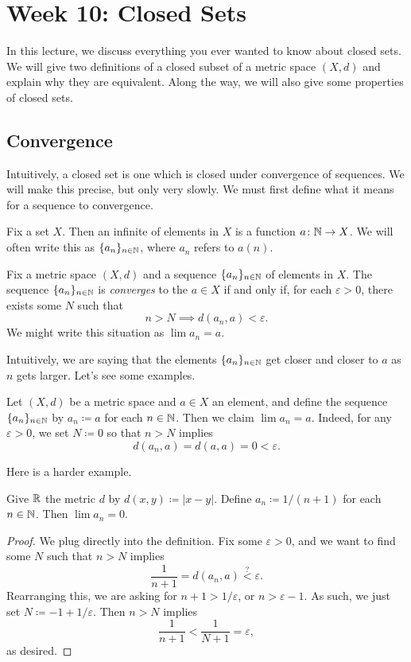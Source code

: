 \documentclass[../main.tex]{subfiles}
\begin{document}
\section{Week 10: Closed Sets}
In this lecture, we discuss everything you ever wanted to know about closed sets. We will give two definitions of a closed subset of a metric space $(X,d)$ and explain why they are equivalent. Along the way, we will also give some properties of closed sets.

\subsection{Convergence}
Intuitively, a closed set is one which is closed under convergence of sequences. We will make this precise, but only very slowly. We must first define what it means for a sequence to convergence.
\begin{definition}[sequence]
    Fix a set $X$. Then an infinite  of elements in $X$ is a function $a\colon\mathbb N\to X$. We will often write this as $\{a_n\}_{n\in\mathbb N}$, where $a_n$ refers to $a(n)$.
\end{definition}
\begin{definition}[limit]
    Fix a metric space $(X,d)$ and a sequence $\{a_n\}_{n\in\mathbb N}$ of elements in $X$. The sequence $\{a_n\}_{n\in\mathbb N}$ is \textit{converges} to the  $a\in X$ if and only if, for each $\varepsilon>0$, there exists some $N$ such that
    \[n>N\implies d(a_n,a)<\varepsilon.\]
    We might write this situation as $\lim a_n=a$.
\end{definition}
Intuitively, we are saying that the elements $\{a_n\}_{n\in\mathbb N}$ get closer and closer to $a$ as $n$ gets larger. Let's see some examples.
\begin{example}
    Let $(X,d)$ be a metric space and $a\in X$ an element, and define the sequence $\{a_n\}_{n\in\mathbb N}$ by $a_n\coloneqq a$ for each $n\in\mathbb N$. Then we claim $\lim a_n=a$. Indeed, for any $\varepsilon>0$, we set $N\coloneqq0$ so that $n>N$ implies
    \[d(a_n,a)=d(a,a)=0<\varepsilon.\]
\end{example}
Here is a harder example.
\begin{example} \label{exe:converge-to-zero}
    Give $\mathbb R$ the metric $d$ by $d(x,y)\coloneqq|x-y|$. Define $a_n\coloneqq1/(n+1)$ for each $n\in\mathbb N$. Then $\lim a_n=0$.
\end{example}
\begin{proof}
    We plug directly into the definition. Fix some $\varepsilon>0$, and we want to find some $N$ such that $n>N$ implies
    \[\frac1{n+1}=d(a_n,a)\stackrel?<\varepsilon.\]
    Rearranging this, we are asking for $n+1>1/\varepsilon$, or $n>\varepsilon-1$. As such, we just set $N\coloneqq-1+1/\varepsilon$. Then $n>N$ implies
    \[\frac1{n+1}<\frac1{N+1}=\varepsilon,\]
    as desired.
\end{proof}
\end{document}
